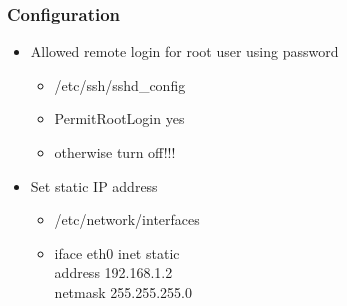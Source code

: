 \documentclass{beamer}
\begin{document}
\begin{frame}
	\frametitle{Configuration}
		\begin{itemize}
			\item Allowed remote login for root user using password
					\begin{itemize}
						\item /etc/ssh/sshd\_config
						\item PermitRootLogin yes
						\item otherwise turn off!!!
					\end{itemize}
			\item Set static IP address
					\begin{itemize}
						\item /etc/network/interfaces
						\item iface eth0 inet static \\address 192.168.1.2 \\netmask 255.255.255.0	
					\end{itemize}
		\end{itemize}
\end{frame}
\end{document}
